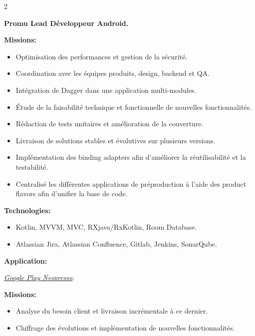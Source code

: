 \documentclass[10pt,a4paper,withhyper]{altacv}
\begin{document}
\begin{paracol}{2}
\divider


\textbf{Promu Lead Développeur Android.}
\newline

\textbf{Missions:}
\begin{itemize}
\addtolength{\itemindent}{0.1cm}
\item Optimisation des performances et gestion de la sécurité.
\item Coordination avec les équipes produits, design, backend et QA.
\item Intégration de Dagger dans une application multi-modules.
\item Étude de la faisabilité technique et fonctionnelle de nouvelles fonctionnalités.
\item Rédaction de tests unitaires et amélioration de la couverture.
\item Livraison de solutions stables et évolutives sur plusieurs versions.
\item Implémentation des binding adapters afin d’améliorer la réutilisabilité et la testabilité.
\item Centralisé les différentes applications de préproduction à l’aide des product flavors afin d’unifier la base de code.
\end{itemize}

\textbf{Technologies:}
\begin{itemize}
	\addtolength{\itemindent}{0.1cm}
	\item Kotlin, MVVM, MVC, RXjava/RxKotlin, Room Database.
	\item Atlassian Jira, Atlassian Confluence, Gitlab, Jenkins, SonarQube.
\end{itemize}
\textbf{Application:}

\href{https://play.google.com/store/apps/details?id=com.nespresso.activities&hl=fr}{\textit{Google Play Nespresso}}.

\divider



\textbf{Missions:}
\begin{itemize}
	\addtolength{\itemindent}{0.1cm}
	\item Analyse du besoin client et livraison incrémentale à ce dernier.
	\item Chiffrage des évolutions et implémentation de nouvelles fonctionnalités.
\end{itemize}


\end{paracol}
\end{document}
